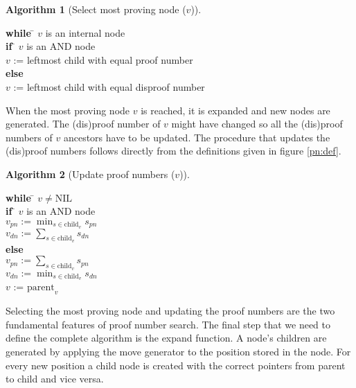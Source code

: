 \documentclass{article}
\begin{document}
\begin{samepage}
\theoremstyle{definition}
\newtheorem{algorithm}{Algorithm}
\begin{algorithm}[Select most proving node ($v$)]
\hfill\par
\begin{tabbing}
  \textbf{while} \= $v$ is an internal node \\
  \> \textbf{if} \= $v$ is an AND node\\
  \> \> $v$ := leftmost child with equal proof number\\
  \> \textbf{else} \\
  \> \> $v$ := leftmost child with equal disproof number
\end{tabbing}
\end{algorithm}
\end{samepage}

When the most proving node $v$ is reached, it is expanded and new nodes are generated. The (dis)proof number of $v$ might have
changed so all the (dis)proof numbers of $v$ ancestors have to be updated. The procedure that updates the (dis)proof numbers
follows directly from the definitions given in figure \ref{pn:def}.

\begin{samepage}
\begin{algorithm}[Update proof numbers ($v$)]
\hfill\par
\begin{tabbing}
  \textbf{while} \= $v \not= \text{NIL}$\\
  \> \textbf{if} \= $v$ is an AND node\\
  \> \> $v_{pn} := \min_{s \in \text{child}_v} s_{pn}$\\
  \> \> $v_{dn} := \sum_{s \in \text{child}_v} s_{dn}$\\
  \> \textbf{else} \\
  \> \> $v_{pn} := \sum_{s \in \text{child}_v} s_{pn}$\\
  \> \> $v_{dn} := \min_{s \in \text{child}_v} s_{dn}$\\
  \> $v$ := $\text{parent}_v$
\end{tabbing}
\end{algorithm}
\end{samepage}

Selecting the most proving node and updating the proof numbers are the two fundamental features of proof number search. The final step
that we need to define the complete algorithm is the expand function. A node's children are generated by applying the move generator
to the position stored in the node. For every new position a child node is created with the correct pointers from parent to child
and vice versa.
\end{document}
